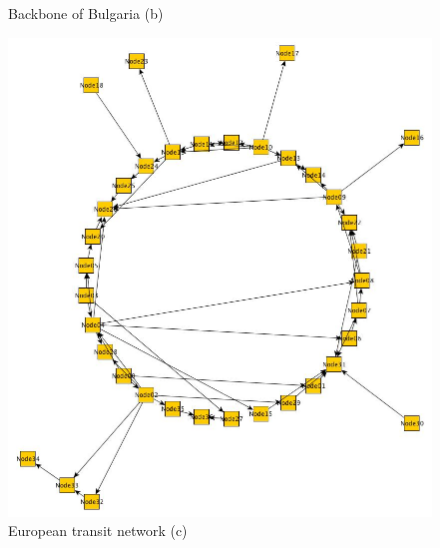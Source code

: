 \begin{figure}[h!]
\begin{minipage}[t]{0.45\textwidth}
      Backbone of Bulgaria (b)
   \end{minipage}
   \vspace{4ex}
    \begin{minipage}[c]{0.45\textwidth}
    \vspace{0pt}
    \includegraphics[width=\linewidth]{Geant2010.jpg}
    European transit network (c)
    \end{minipage}
    \begin{minipage}[c]{0.45\textwidth}
    \vspace{0pt}

\end{minipage}
\end{figure}
